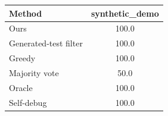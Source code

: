 \begin{tabular}{lc}
\toprule
Method & synthetic_demo \\
\midrule
Ours & 100.0 \\
Generated-test filter & 100.0 \\
Greedy & 100.0 \\
Majority vote & 50.0 \\
Oracle & 100.0 \\
Self-debug & 100.0 \\
\bottomrule
\end{tabular}
